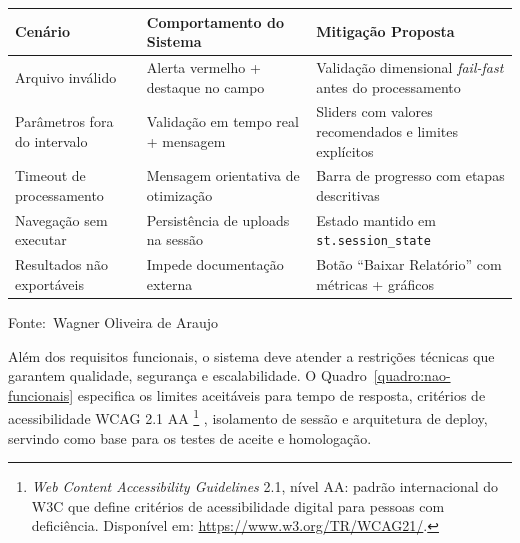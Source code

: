 \documentclass[12pt,a4paper]{article}
\newcommand{\oautor}{Wagner Oliveira de Araujo}
\begin{document}
\begin{quadro}[ht]
\centering
\small
\caption{Tratamento de exceções e usabilidade}
\label{quadro:excecoes}
\begin{threeparttable}
\begin{tabularx}{\textwidth}{|l|X|X|} \hline
\textbf{Cenário} & \textbf{Comportamento do Sistema} & \textbf{Mitigação Proposta} \\ \hline
Arquivo inválido & Alerta vermelho + destaque no campo & Validação dimensional \textit{fail-fast} antes do processamento \\ \hline
Parâmetros fora do intervalo & Validação em tempo real + mensagem & Sliders com valores recomendados e limites explícitos \\ \hline
Timeout de processamento & Mensagem orientativa de otimização & Barra de progresso com etapas descritivas \\ \hline
Navegação sem executar & Persistência de uploads na sessão & Estado mantido em \texttt{st.session\_state} \\ \hline
Resultados não exportáveis & Impede documentação externa & Botão ``Baixar Relatório'' com métricas + gráficos \\ \hline
\end{tabularx}
\begin{tablenotes}[flushleft]
\footnotesize
\item Fonte:~\oautor
\end{tablenotes}
\end{threeparttable}
\end{quadro}

Além dos requisitos funcionais, o sistema deve atender a restrições técnicas que garantem qualidade, segurança e escalabilidade. O Quadro~\ref{quadro:nao-funcionais} especifica os limites aceitáveis para tempo de resposta, critérios de acessibilidade WCAG 2.1 AA \footnote{%
  \textit{Web Content Accessibility Guidelines} 2.1, nível AA: padrão
  internacional do W3C que define critérios de acessibilidade digital
  para pessoas com deficiência. Disponível em: \url{https://www.w3.org/TR/WCAG21/}.} , isolamento de sessão e arquitetura de deploy, servindo como base para os testes de aceite e homologação.
\end{document}
